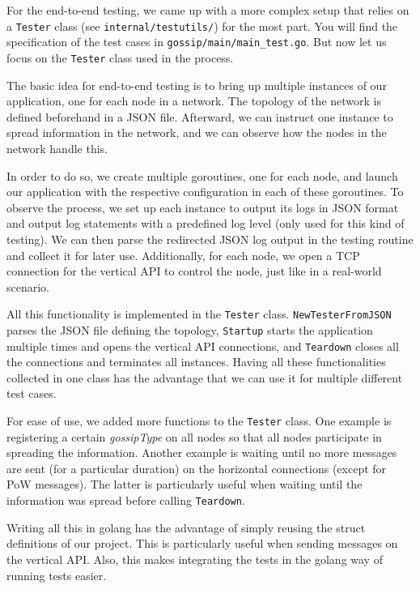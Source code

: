 \documentclass[a4paper,english,10pt,NET]{tumarticle}
\begin{document}
For the end-to-end testing, we came up with a more complex setup that relies on a \texttt{Tester} class (see \texttt{internal/testutils/}) for the most part.
You will find the specification of the test cases in \texttt{gossip/main/main\_test.go}.
But now let us focus on the \texttt{Tester} class used in the process.

The basic idea for end-to-end testing is to bring up multiple instances of our application, one for each node in a network.
The topology of the network is defined beforehand in a JSON file.
Afterward, we can instruct one instance to spread information in the network, and we can observe how the nodes in the network handle this.

In order to do so, we create multiple goroutines, one for each node, and launch our application with the respective configuration in each of these goroutines.
To observe the process, we set up each instance to output its logs in JSON format and output log statements with a predefined log level (only used for this kind of testing).
We can then parse the redirected JSON log output in the testing routine and collect it for later use.
Additionally, for each node, we open a TCP connection for the vertical API to control the node, just like in a real-world scenario.

All this functionality is implemented in the \texttt{Tester} class.
\texttt{NewTesterFromJSON} parses the JSON file defining the topology,
\texttt{Startup} starts the application multiple times and opens the vertical API connections, and
\texttt{Teardown} closes all the connections and terminates all instances.
Having all these functionalities collected in one class has the advantage that we can use it for multiple different test cases.

For ease of use, we added more functions to the \texttt{Tester} class.
One example is registering a certain \emph{gossipType} on all nodes so that all nodes participate in spreading the information.
Another example is waiting until no more messages are sent (for a particular duration) on the horizontal connections (except for PoW messages).
The latter is particularly useful when waiting until the information was spread before calling \texttt{Teardown}.

Writing all this in golang has the advantage of simply reusing the struct definitions of our project.
This is particularly useful when sending messages on the vertical API.
Also, this makes integrating the tests in the golang way of running tests easier.
\end{document}
